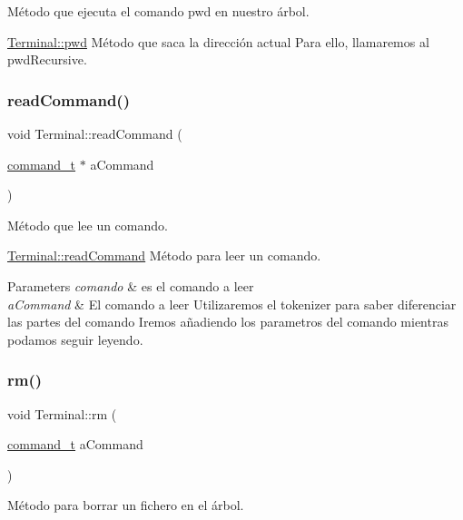 Método que ejecuta el comando pwd en nuestro árbol. 

\hyperlink{classTerminal_a5e3706157c23216bcde9a7b68a2f0663}{Terminal\+::pwd} Método que saca la dirección actual Para ello, llamaremos al pwd\+Recursive. \mbox{\label{classTerminal_aad3c1f2a554ab12d7f27a1fabded2b00}} 
\subsubsection{\texorpdfstring{read\+Command()}{readCommand()}}
{\footnotesize\ttfamily void Terminal\+::read\+Command (\begin{DoxyParamCaption}\item[{\hyperlink{structcommand__t}{command\+\_\+t} $\ast$}]{a\+Command }\end{DoxyParamCaption})}



Método que lee un comando. 

\hyperlink{classTerminal_aad3c1f2a554ab12d7f27a1fabded2b00}{Terminal\+::read\+Command} Método para leer un comando.


\begin{DoxyParams}{Parameters}
{\em comando} & es el comando a leer\\
\hline
{\em a\+Command} & El comando a leer Utilizaremos el tokenizer para saber diferenciar las partes del comando Iremos añadiendo los parametros del comando mientras podamos seguir leyendo. \\
\hline
\end{DoxyParams}
\mbox{\label{classTerminal_aa87d8e5d00abd8fc52d8c5e93439ae9a}} 
\subsubsection{\texorpdfstring{rm()}{rm()}}
{\footnotesize\ttfamily void Terminal\+::rm (\begin{DoxyParamCaption}\item[{\hyperlink{structcommand__t}{command\+\_\+t}}]{a\+Command }\end{DoxyParamCaption})}



Método para borrar un fichero en el árbol. 

